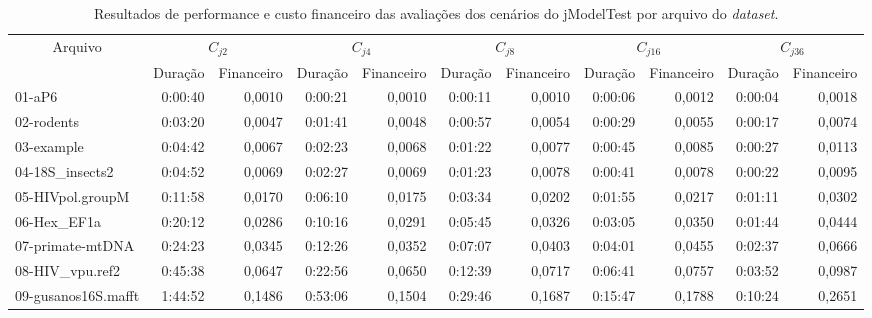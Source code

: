 \documentclass[english,brazilian]{UNISINOSmonografia} %
\renewcommand{\arraystretch}{1.3}
\begin{document}
{\begin{landscape}
		
		
		
		\begin{table}
			\centering%
			\begin{minipage}{\linewidth}
				\caption{Resultados de performance e custo financeiro das avaliações dos cenários do jModelTest por arquivo do \textit{dataset}.}
				\label{tab:results-custos-jmodeltest}
				\vspace{0.75ex}
				\renewcommand\arraystretch{1.4}
				\begin{tabular*}{\linewidth}{@{\extracolsep{\fill}}lrrrrrrrrrr@{}}
					\toprule
					\multicolumn{1}{c}{\multirow{2}{*}{Arquivo}} & \multicolumn{2}{c}{$C_{j2}$} & \multicolumn{2}{c}{$C_{j4}$} & \multicolumn{2}{c}{$C_{j8}$} & \multicolumn{2}{c}{$C_{j16}$} & \multicolumn{2}{c}{$C_{j36}$} \\
					\cmidrule(r){2-3}
					\cmidrule(lr){4-5}
					\cmidrule(lr){6-7}
					\cmidrule(lr){8-9}
					\cmidrule(l){10-11}
					\multicolumn{1}{c}{} & Duração & Financeiro & Duração & Financeiro & Duração & Financeiro & Duração & Financeiro & Duração & Financeiro \\
					\midrule
					01-aP6 & 0:00:40 & 0,0010 & 0:00:21 & 0,0010 & 0:00:11 & 0,0010 & 0:00:06 & 0,0012 & 0:00:04 & 0,0018 \\
					02-rodents & 0:03:20 & 0,0047 & 0:01:41 & 0,0048 & 0:00:57 & 0,0054 & 0:00:29 & 0,0055 & 0:00:17 & 0,0074 \\
					03-example & 0:04:42 & 0,0067 & 0:02:23 & 0,0068 & 0:01:22 & 0,0077 & 0:00:45 & 0,0085 & 0:00:27 & 0,0113 \\
					04-18S\_insects2 & 0:04:52 & 0,0069 & 0:02:27 & 0,0069 & 0:01:23 & 0,0078 & 0:00:41 & 0,0078 & 0:00:22 & 0,0095 \\
					05-HIVpol.groupM & 0:11:58 & 0,0170 & 0:06:10 & 0,0175 & 0:03:34 & 0,0202 & 0:01:55 & 0,0217 & 0:01:11 & 0,0302 \\
					06-Hex\_EF1a & 0:20:12 & 0,0286 & 0:10:16 & 0,0291 & 0:05:45 & 0,0326 & 0:03:05 & 0,0350 & 0:01:44 & 0,0444 \\
					07-primate-mtDNA & 0:24:23 & 0,0345 & 0:12:26 & 0,0352 & 0:07:07 & 0,0403 & 0:04:01 & 0,0455 & 0:02:37 & 0,0666 \\
					08-HIV\_vpu.ref2 & 0:45:38 & 0,0647 & 0:22:56 & 0,0650 & 0:12:39 & 0,0717 & 0:06:41 & 0,0757 & 0:03:52 & 0,0987 \\
					09-gusanos16S.mafft & 1:44:52 & 0,1486 & 0:53:06 & 0,1504 & 0:29:46 & 0,1687 & 0:15:47 & 0,1788 & 0:10:24 & 0,2651 \\

\end{tabular*}
\end{minipage}
\end{table}
\end{landscape}}
\end{document}
